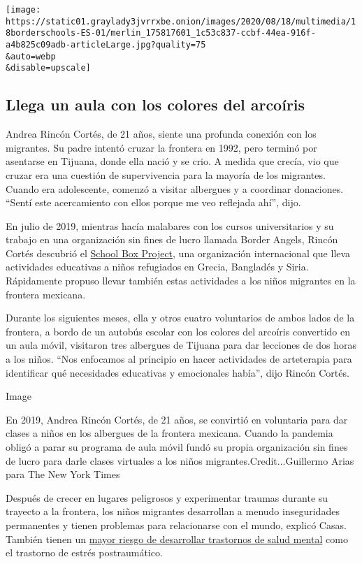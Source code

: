 \texttt{[image: https://static01.graylady3jvrrxbe.onion/images/2020/08/18/multimedia/18borderschools-ES-01/merlin\_175817601\_1c53c837-ccbf-44ea-916f-a4b825c09adb-articleLarge.jpg?quality=75\\\&auto=webp\\\&disable=upscale]}

\hypertarget{llega-un-aula-con-los-colores-del-arcouxedris}{%
\subsection{Llega un aula con los colores del
arcoíris}\label{llega-un-aula-con-los-colores-del-arcouxedris}}

Andrea Rincón Cortés, de 21 años, siente una profunda conexión con los
migrantes. Su padre intentó cruzar la frontera en 1992, pero terminó por
asentarse en Tijuana, donde ella nació y se crio. A medida que crecía,
vio que cruzar era una cuestión de supervivencia para la mayoría de los
migrantes. Cuando era adolescente, comenzó a visitar albergues y a
coordinar donaciones. ``Sentí este acercamiento con ellos porque me veo
reflejada ahí'', dijo.

En julio de 2019, mientras hacía malabares con los cursos universitarios
y su trabajo en una organización sin fines de lucro llamada Border
Angels, Rincón Cortés descubrió el
\href{https://www.schoolboxproject.org/us-mexican-border}{School Box
Project}, una organización internacional que lleva actividades
educativas a niños refugiados en Grecia, Bangladés y Siria. Rápidamente
propuso llevar también estas actividades a los niños migrantes en la
frontera mexicana.

Durante los siguientes meses, ella y otros cuatro voluntarios de ambos
lados de la frontera, a bordo de un autobús escolar con los colores del
arcoíris convertido en un aula móvil, visitaron tres albergues de
Tijuana para dar lecciones de dos horas a los niños. ``Nos enfocamos al
principio en hacer actividades de arteterapia para identificar qué
necesidades educativas y emocionales había'', dijo Rincón Cortés.

Image

En 2019, Andrea Rincón Cortés, de 21 años, se convirtió en voluntaria
para dar clases a niños en los albergues de la frontera mexicana. Cuando
la pandemia obligó a parar su programa de aula móvil fundó su propia
organización sin fines de lucro para darle clases virtuales a los niños
migrantes.Credit...Guillermo Arias para The New York Times

Después de crecer en lugares peligrosos y experimentar traumas durante
su trayecto a la frontera, los niños migrantes desarrollan a menudo
inseguridades permanentes y tienen problemas para relacionarse con el
mundo, explicó Casas. También tienen un
\href{https://oxfordre.com/publichealth/view/10.1093/acrefore/9780190632366.001.0001/acrefore-9780190632366-e-12}{mayor
riesgo de desarrollar trastornos de salud mental} como el trastorno de
estrés postraumático.

